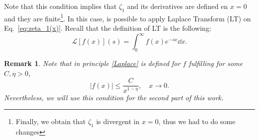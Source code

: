 \documentclass[%
 aip,
 jmp,%
 amsmath,amssymb,
 reprint,%
]{revtex4-2}
\begin{document}
Note that this condition implies that $\zeta_1$ and its derivatives are defined en $x = 0$ and they are finite\footnote{Finally, we obtain that $\zeta_1$ is divergent in $x = 0$, thus we had to do some changes}. In this case, is possible to apply Laplace Transform (LT) on Eq.~\eqref{eq:zeta_1(x)}. Recall that the definition of LT is the following:
\begin{equation}\label{Laplace}
    \mathcal{L}\left[f(x)\right](s)=\int_0^\infty f(x)e^{-sx}\dd{x}.
\end{equation}
\newtheorem*{remark}{Remark}
\begin{remark}
Note that in principle \eqref{Laplace} is defined for $f$ fulfilling for some $C,\eta>0$,
\[
|f(x)| \leq \frac{C}{x^{1-\eta}}, \quad x\to 0.
\]
Nevertheless, we will use this condition for the second part of this work.
\end{remark}



\medskip
\end{document}
